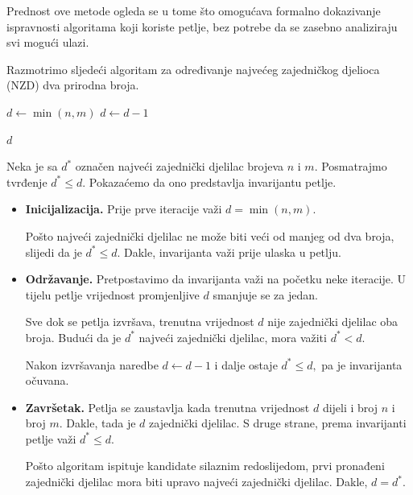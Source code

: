 Prednost ove metode ogleda se u tome što omogućava formalno dokazivanje ispravnosti algoritama koji koriste petlje, bez potrebe da se zasebno analiziraju svi mogući ulazi.

\begin{example}
	Razmotrimo sljedeći algoritam za određivanje najvećeg zajedničkog djelioca (NZD) dva prirodna broja.
\end{example}

\begin{algorithm}[H]
	\begin{algorithmic}[1]
		\State $d \gets \min(n,m)$
		\State $d \gets d-1$
		\EndWhile
		
		\State \Return $d$
		\EndProcedure
	\end{algorithmic}
	\caption{Naivni algoritam za određivanje NZD-a.}
	\label{alg:nzd}
	
\end{algorithm}

Neka je sa $d^*$ označen najveći zajednički djelilac brojeva $n$ i $m$. Posmatrajmo tvrđenje $
d^* \leq d.
$  Pokazaćemo da ono predstavlja invarijantu petlje.

\begin{itemize}
	\item \textbf{Inicijalizacija.} Prije prve iteracije važi $
	d=\min(n,m).
	$
	
	Pošto najveći zajednički djelilac ne može biti veći od manjeg od dva broja, slijedi da je 	$
	d^* \leq d.
	$   Dakle, invarijanta važi prije ulaska u petlju.
	
	\item \textbf{Održavanje.} Pretpostavimo da invarijanta važi na početku neke iteracije. U tijelu petlje vrijednost promjenljive $d$ smanjuje se za jedan.
	
	Sve dok se petlja izvršava, trenutna vrijednost $d$ nije zajednički djelilac oba broja. Budući da je $d^*$ najveći zajednički djelilac, mora važiti 	$
	d^* < d.
	$
	
	Nakon izvršavanja naredbe $d \gets d-1$ i dalje ostaje 	$
	d^* \leq d,
	$ pa je invarijanta očuvana.
	
	\item \textbf{Završetak.} Petlja se zaustavlja kada trenutna vrijednost $d$ dijeli i broj $n$ i broj $m$. Dakle, tada je $d$ zajednički djelilac. 	S druge strane, prema invarijanti petlje važi $
	d^* \leq d.
	$
	
	Pošto algoritam ispituje kandidate silaznim redoslijedom, prvi pronađeni zajednički djelilac mora biti upravo najveći zajednički djelilac. Dakle, 	$
	d=d^*.
	$
\end{itemize}

